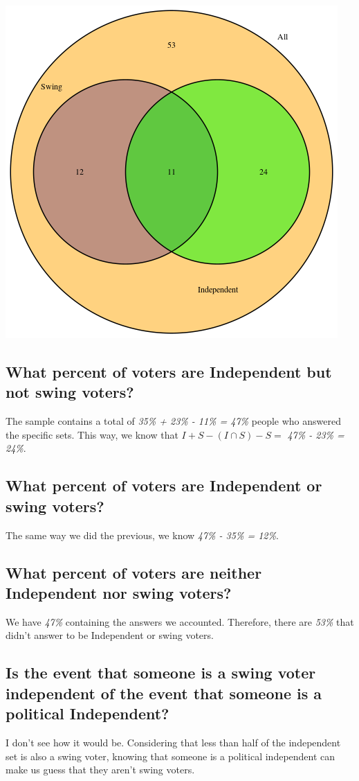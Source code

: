 \documentclass[11pt]{article}
\begin{document}
\begin{center}
\includegraphics[width=.9\linewidth]{venn.png}
\end{center}

\subsection{What percent of voters are Independent but not swing voters?}
\label{sec:org430438c}
The sample contains a total of \emph{35\% + 23\% - 11\% = 47\%} people who answered the specific sets. This way, we know that \(I + S - (I \cap S) - S =\) \emph{47\% - 23\% = 24\%}. 
\subsection{What percent of voters are Independent or swing voters?}
\label{sec:org0f7b70f}
The same way we did the previous, we know \emph{47\% - 35\% = 12\%}.
\subsection{What percent of voters are neither Independent nor swing voters?}
\label{sec:org146cb02}
We have \emph{47\%} containing the answers we accounted. Therefore, there are \emph{53\%} that didn't answer to be Independent or swing voters.
\subsection{Is the event that someone is a swing voter independent of the event that someone is a political Independent?}
\label{sec:org6cf97bc}
I don't see how it would be. Considering that less than half of the independent set is also a swing voter, knowing that someone is a political independent can make us guess that they aren't swing voters.
\end{document}
